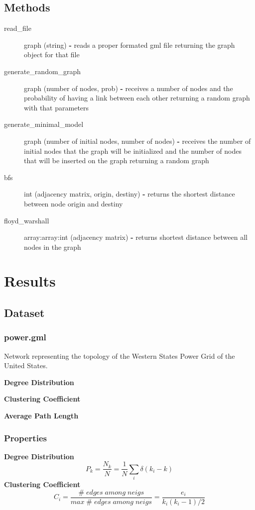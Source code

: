 \documentclass[a4paper,titlepage,11pt]{article}
\begin{document}
\subsection*{Methods}
\begin{description}
\item [read\_file] graph (string) \textbf{-} reads a proper formated gml file returning the graph object for that file
\item [generate\_random\_graph] graph (number of nodes, prob) \textbf{-} receives a number of nodes and the probability of
                                                            having a link between each other returning a random graph with that parameters
\item [generate\_minimal\_model] graph (number of initial nodes, number of nodes) \textbf{-} receives the number of initial nodes that the 																graph will be initialized and the number of nodes that will be inserted on 																 the graph returning a random graph
\item [bfs] int (adjacency matrix, origin, destiny) \textbf{-} returns the shortest distance between node origin and destiny
\item [floyd\_warshall] array:array:int (adjacency matrix) \textbf{-} returns shortest distance between all nodes in the graph 

\end{description}

\section{Results}
\subsection{Dataset}
\subsubsection{power.gml}
	Network representing the topology of the Western States Power Grid of the United States.

\textbf{Degree Distribution}

\textbf{Clustering Coefficient}

\textbf{Average Path Length}


\subsubsection{Properties}
\textbf{Degree Distribution}
\[
  P_k = \frac{N_k}{N} = \frac{1}{N}\sum_{i}{\delta(k_i-k)}
\]
\textbf{Clustering Coefficient}
\[
  C_i = \frac{\#\; edges\; among\; neigs}{max\; \# \; edges\; among \; neigs} = \frac{e_i}{k_i(k_i-1)/2}
\]
\end{document}
